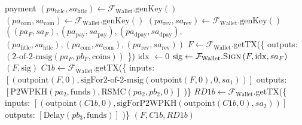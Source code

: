 \begin{algorithmic}[1]
{      payment}
      \State $\left(pa_{\mathrm{htlc}}, sa_{\mathrm{htlc}}\right) \leftarrow
      \mathcal{F}_{\mathrm{Wallet}}.\mathrm{genKey}\left(\right)$ 
      \State $\left(pa_{\mathrm{com}}, sa_{\mathrm{com}}\right) \leftarrow
      \mathcal{F}_{\mathrm{Wallet}}.\mathrm{genKey}\left(\right)$ 
      \State $\left(pa_{\mathrm{rev}}, sa_{\mathrm{rev}}\right) \leftarrow
      \mathcal{F}_{\mathrm{Wallet}}.\mathrm{genKey}\left(\right)$ 
      \State \Return $\left(\left(pa_F, sa_F\right), \left(pa_{\mathrm{pay}},
      sa_{\mathrm{pay}}\right), \left(pa_{\mathrm{dpay}},
      sa_{\mathrm{dpay}}\right),\right.$
      \Indent
        \State $\left.\left(pa_{\mathrm{htlc}}, sa_{\mathrm{htlc}}\right),
        \left(pa_{\mathrm{com}}, sa_{\mathrm{com}}\right), \left(pa_{\mathrm{rev}},
        sa_{\mathrm{rev}}\right)\right)$
      \EndIndent
    \EndFunction
    \State
      \State $F \gets \mathcal{F}_{\mathrm{Wallet}}$.getTX(\{
      \Indent
        \State outputs: $\left(\text{2-of-2-msig}\left(pa_F, pb_F,
        \mathrm{coins}\right)\right)$ 
      \EndIndent
      \State \})
      \State idx $\gets 0$
      \State $\mathrm{sig} \gets \mathcal{F}_{\mathrm{Wallet}}.\textsc{Sign}\left(F,
      \mathrm{idx}, sa_F\right)$
      \State \Return $\left(F, \mathrm{sig}\right)$
    \EndFunction
    \State
      \State $C1b \gets \mathcal{F}_{\mathrm{Wallet}}$.getTX(\{
      \State inputs: $\left[\left(\mathrm{outpoint}\left(F, 0\right),
      \text{sigFor2-of-2-msig}\left(\mathrm{outpoint}\left(F, 0\right), 0,
      sa_1\right)\right)\right]$
      \State outputs: $\left[\mathrm{P2WPKH}\left(pa_2, \mathrm{funds}\right),
      \mathrm{RSMC}\left(pa_2, pb_2, 0\right)\right]$
      \State )\}
      \State $RD1b \gets \mathcal{F}_{\mathrm{Wallet}}$.getTX(\{
      \State inputs: $\left[\left(\mathrm{outpoint}\left(C1b, 0\right),
      \text{sigForP2WPKH}\left(\mathrm{outpoint}\left(C1b, 0\right),
      sa_2\right)\right)\right]$
      \State outputs: $\left[\mathrm{Delay}\left(pb_3, \mathrm{funds}\right)\right]$
      \State )\}
      \State \Return $\left(F, C1b, RD1b\right)$
    \EndFunction
    \State

\end{algorithmic}
